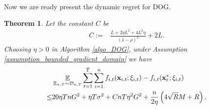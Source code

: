 \documentclass{article}
\newtheorem{Theorem}{\bf{Theorem}}
\begin{document}
Now we are ready present the dynamic regret for DOG.
\begin{Theorem}
\label{theorem_regret_upper_bound}
Let the constant $C$ be
\begin{align}
\nonumber
C := & \frac{L + 2\eta L^2  + 4L^2 \eta}{(1-\rho)^2} +2L.
\end{align} Choosing $\eta>0$ in Algorithm \ref{algo_DOG}, under Assumption \ref{assumption_bounded_gradient_domain} we have
\begin{align}
\nonumber
& \mathop{\mathbb{E}}_{ \Xi_{n,T} \sim \mathcal{D}_{n,T} } \sum_{t=1}^T\sum_{i=1}^n f_{i,t}({\bf x}_{i,t};\xi_{i,t}) - f_{i,t}({\bf x}_t^\ast;\xi_{i,t}) \\ \nonumber
\le & 20\eta T n G^2 +  \eta T\sigma^2 + C nT\eta^2 G^2    + \frac{n}{2\eta}\left(  4\sqrt{R}M + R   \right).
\end{align}
\end{Theorem}
\end{document}
